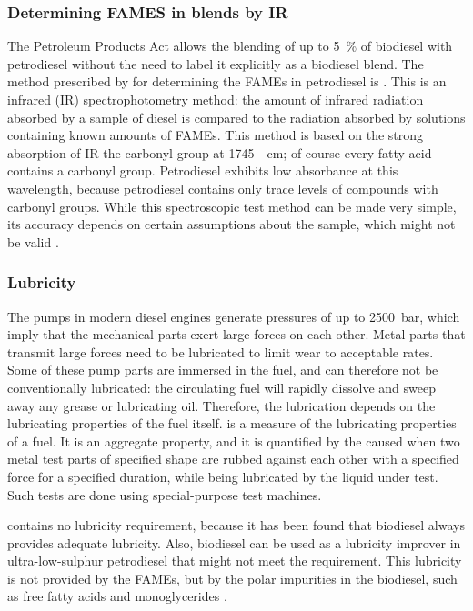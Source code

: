 \subsubsection[FAMEs by IR]{Determining FAMES in blends by IR} The Petroleum
Products Act allows the blending of up to \SI{5}{\percent} of biodiesel with
petrodiesel without the need to label it explicitly as a biodiesel blend. The
method prescribed by  for determining the FAMEs in petrodiesel is
. This is an infrared (IR) spectrophotometry method: the amount of
infrared radiation absorbed by a sample of diesel is compared to the radiation
absorbed by solutions containing known amounts of FAMEs. This method is based on
the strong absorption of IR the carbonyl group at \SI{1745}{\per\centi\metre};
of course every fatty acid contains a carbonyl group. Petrodiesel exhibits low
absorbance at this wavelength, because petrodiesel contains only trace levels of
compounds with carbonyl groups. While this spectroscopic test method can be made
very simple, its accuracy depends on certain assumptions about the sample, which
might not be valid \autocite{Pinho2014}.

\subsubsection{Lubricity}
The pumps in modern diesel engines generate pressures of up to \SI{2500}{\bar},
which imply that the mechanical parts exert large forces on each other.
Metal parts that transmit large forces need to be lubricated to limit wear to
acceptable rates. Some of these pump parts are immersed in the fuel, and can
therefore not be conventionally lubricated: the circulating fuel will rapidly
dissolve and sweep away any grease or lubricating oil. Therefore, the
lubrication depends on the lubricating properties of the fuel itself.
 is a measure of the lubricating properties of a fuel. It is
an aggregate property, and it is quantified by the  caused
when two metal test parts of specified shape are rubbed against each other with
a specified force for a specified duration, while being lubricated by the liquid
under test. Such tests are done using special-purpose test machines.

 contains no lubricity requirement, because it has been found
that biodiesel always provides adequate lubricity. Also, biodiesel can be used
as a lubricity improver in ultra-low-sulphur petrodiesel that might not meet the
requirement. This lubricity is not provided by the FAMEs, but by the polar
impurities in the biodiesel, such as free fatty acids and monoglycerides
\autocite{Knothe2005}.


